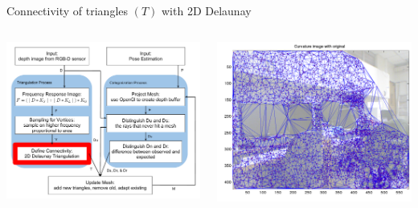 \documentclass{beamer}
\begin{document}
\begin{frame}{Connectivity of triangles $(T)$ with 2D Delaunay}
\vspace{-.1in}
\begin{columns}
  \begin{center}
  \includegraphics[width=\textwidth]{SDconnect.pdf} 
  \end{center}
  \begin{center}
  \includegraphics[width=\textwidth]{m_ctr.pdf} 
  \end{center}
\end{columns}
\end{frame}
\end{document}
